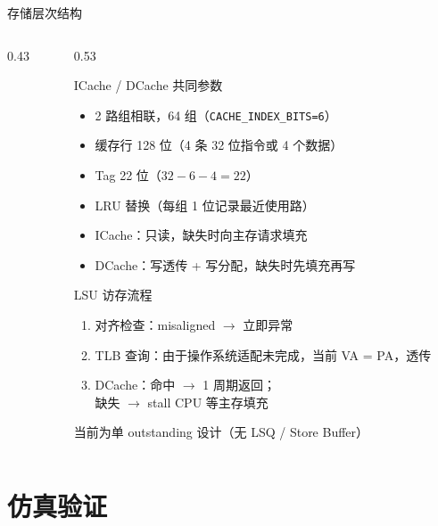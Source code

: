 \documentclass[aspectratio=169,xcolor={dvipsnames,svgnames},10pt]{beamer}
\newcommand{\code}[1]{\texttt{\small\color{PrimaryBlue}#1}}
\begin{document}
\begin{frame}[shrink=4]{存储层次结构}
\begin{columns}[T]
\begin{column}{0.43\textwidth}
\begin{center}
      \end{center}
    \end{column}
    \begin{column}{0.53\textwidth}
      \begin{block}{ICache / DCache 共同参数}
        \small
        \begin{itemize}
          \item 2 路组相联，64 组（\code{CACHE\_INDEX\_BITS=6}）
          \item 缓存行 128 位（4 条 32 位指令或 4 个数据）
          \item Tag 22 位（$32 - 6 - 4 = 22$）
          \item LRU 替换（每组 1 位记录最近使用路）
          \item ICache：只读，缺失时向主存请求填充
          \item DCache：写透传 + 写分配，缺失时先填充再写
        \end{itemize}
      \end{block}
      \vspace{0.15cm}
      \begin{block}{LSU 访存流程}
        \small
        \begin{enumerate}
          \item 对齐检查：misaligned $\to$ 立即异常
          \item TLB 查询：由于操作系统适配未完成，当前 VA = PA，透传
          \item DCache：命中 $\to$ 1 周期返回；\\
                \phantom{DCache：}缺失 $\to$ stall CPU 等主存填充
        \end{enumerate}
        {\footnotesize\textcolor{MidGray}{当前为单 outstanding 设计（无 LSQ / Store Buffer）}}
      \end{block}
    \end{column}
  \end{columns}
\end{frame}

\section{仿真验证}
\end{document}
